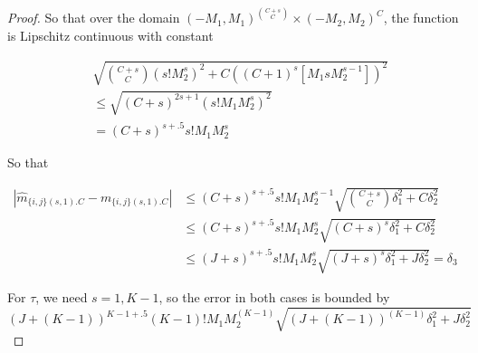 \documentclass[]{article}
\begin{document}
\begin{proof}
So that over the domain $(-M_1, M_1)^{{C + s \choose C}} \times (-M_2, M_2)^{C}$, the function is Lipschitz continuous with constant

\begin{equation}
\begin{aligned}
& \sqrt{{C + s \choose C}\left(s!M_2^{s}\right)^2 + C\left((C+1)^s \left[M_1 s M_2^{s - 1}\right]\right)^2}
\\
&\leq \sqrt{(C+s)^{2s+1}\left(s!M_1 M_2^s\right)^2}
\\
&= (C+s)^{s + .5}s!M_1M_2^s
\end{aligned}
\end{equation}

So that

\begin{equation}
\begin{aligned}
|\hat m_{\{i,j\}(s,1).C} - m_{\{i,j\}(s,1).C}|  &\leq (C+s)^{s + .5}s!M_1M_2^{s-1} \sqrt{{C + s \choose C}\delta_1^2 + C\delta_2^2}\\
&\leq (C+s)^{s + .5}s!M_1M_2^s \sqrt{(C+s)^s\delta_1^2 + C\delta_2^2}
\\
&\leq (J+s)^{s + .5}s!M_1M_2^s \sqrt{(J+s)^s\delta_1^2 + J \delta_2^2} = \delta_3
\end{aligned}
\end{equation}

For $\tau$, we need $s = 1, K-1$, so the error in both cases is bounded by
\[(J+(K-1))^{K-1 + .5}(K-1)!M_1 M_2^{(K-1)} \sqrt{(J+(K-1))^{(K-1)}\delta_1^2 + J \delta_2^2}\]
\end{proof}
\end{document}
